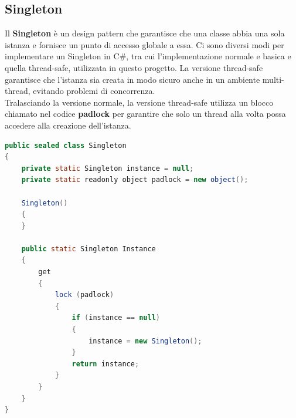 \subsection{Singleton}
Il \textbf{Singleton} è un design pattern che garantisce che una classe abbia una sola istanza e fornisce un punto di accesso globale a essa. Ci sono diversi modi per implementare un Singleton in C\#, tra cui l'implementazione normale e basica e quella thread-safe, utilizzata in questo progetto. La versione thread-safe garantisce che l'istanza sia creata in modo sicuro anche in un ambiente multi-thread, evitando problemi di concorrenza.\\Tralasciando la versione normale, la versione thread-safe utilizza un blocco chiamato nel codice \textbf{padlock} per garantire che solo un thread alla volta possa accedere alla creazione dell'istanza. 
\vspace{10cm}

\begin{lstlisting}[language=java]
public sealed class Singleton
{
    private static Singleton instance = null;
    private static readonly object padlock = new object();

    Singleton()
    {
    }

    public static Singleton Instance
    {
        get
        {
            lock (padlock)
            {
                if (instance == null)
                {
                    instance = new Singleton();
                }
                return instance;
            }
        }
    }
}


\end{lstlisting}
\cite{SingletonPatternCSharp}